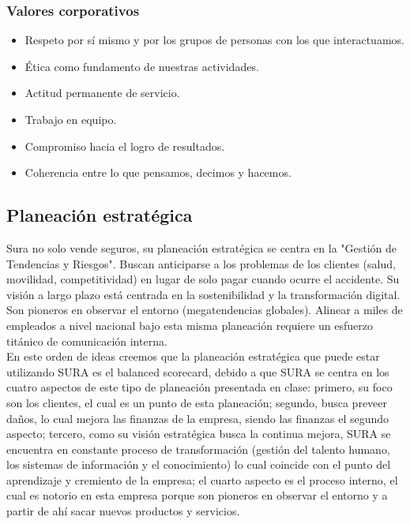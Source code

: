 \documentclass[onecolumn]{article} %
\begin{document}
	\subsubsection{Valores corporativos}
	\begin{itemize}
		\item Respeto por sí mismo y por los grupos de personas con los que interactuamos.
		\item Ética como fundamento de nuestras actividades.
		\item Actitud permanente de servicio.
		\item Trabajo en equipo.
		\item Compromiso hacia el logro de resultados.
		\item Coherencia entre lo que pensamos, decimos y hacemos.
	\end{itemize}
	
	
	\subsection{Planeación estratégica}
	
	Sura no solo vende seguros, su planeación estratégica se centra en la "Gestión de Tendencias y Riesgos". Buscan anticiparse a los problemas de los clientes (salud, movilidad, competitividad) en lugar de solo pagar cuando ocurre el accidente. Su visión a largo plazo está centrada en la sostenibilidad y la transformación digital. Son pioneros en observar el entorno (megatendencias globales). Alinear a miles de empleados a nivel nacional bajo esta misma planeación requiere un esfuerzo titánico de comunicación interna. \\
	
	En este orden de ideas creemos que la planeación estratégica que puede estar utilizando SURA es el balanced scorecard, debido a que SURA se centra en los cuatro aspectos de este tipo de planeación presentada en clase: primero, su foco son los clientes, el cual es un punto de esta planeación; segundo, busca preveer daños, lo cual mejora las finanzas de la empresa, siendo las finanzas el segundo aspecto; tercero, como su visión estratégica busca la continua mejora, SURA se encuentra en constante proceso de transformación (gestión del talento humano, los sistemas de información y el conocimiento) lo cual coincide con el punto del aprendizaje y cremiento de la empresa; el cuarto aspecto es el proceso interno, el cual es notorio en esta empresa porque son pioneros en observar el entorno y a partir de ahí sacar nuevos productos y servicios.\\
	
\end{document}

